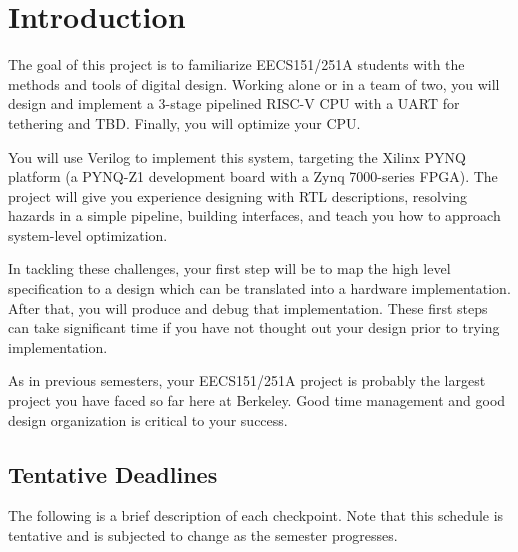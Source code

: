 \section{Introduction}
The goal of this project is to familiarize EECS151/251A students with the methods and tools of digital design.
Working alone or in a team of two, you will design and implement a 3-stage pipelined RISC-V CPU with a UART for tethering and TBD.
Finally, you will optimize your CPU.

You will use Verilog to implement this system, targeting the Xilinx PYNQ platform (a PYNQ-Z1 development board with a Zynq 7000-series FPGA).
The project will give you experience designing with RTL descriptions, resolving hazards in a simple pipeline, building interfaces, and teach you how to approach system-level optimization.

In tackling these challenges, your first step will be to map the high level specification to a design which can be translated into a hardware implementation.
After that, you will produce and debug that implementation.
These first steps can take significant time if you have not thought out your design prior to trying implementation.

As in previous semesters, your EECS151/251A project is probably the largest project you have faced so far here at Berkeley.
Good time management and good design organization is critical to your success.


\subsection{Tentative Deadlines}
The following is a brief description of each checkpoint.
Note that this schedule is tentative and is subjected to change as the semester progresses.

